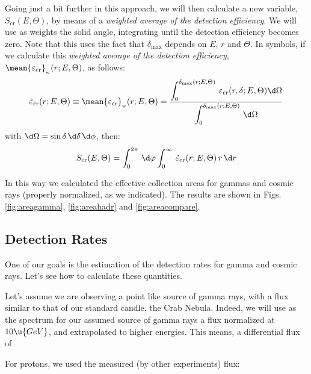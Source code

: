 {Going just a bit further in this approach, we will then calculate a
new variable, $S_{\mathrm{cr}}(E,\Theta)$, by means of a
\emph{weighted average of the detection efficiency}. We will use as
weights the solid angle, integrating until the detection efficiency
becomes zero. Note that this uses the fact that
$\delta_{\mathrm{max}}$ depends on $E$, $r$ and $\Theta$. In symbols,
if we calculate this \emph{weighted average of the detection
  efficiency},
$\mean{\varepsilon_{\mathrm{cr}}}_{\mbox{}_{\mathrm{w}}}(r;E,\Theta)$,
as follows:
%
\begin{equation}
  \label{eq:effw}
  \tilde{\varepsilon}_{\mathrm{cr}}(r;E,\Theta) \equiv 
  \mean{\varepsilon_{\mathrm{cr}}}_{\mbox{}_{\mathrm{w}}}(r;E,\Theta) =
  \frac{\displaystyle\int_0^{\delta_{\mathrm{max}}(r;E,\Theta)}\,
    \varepsilon_{\mathrm{cr}}(r,\delta;E,\Theta)\d\Omega}{
    \displaystyle\int_0^{\delta_{\mathrm{max}}(r;E,\Theta)}\,\d\Omega}
\end{equation}
%
with $\d\Omega = \sin\delta\,\d\delta\,\d\phi$, then:
%
\begin{equation}
  \label{eq:Scrnorm}
  S_{\mathrm{cr}}(E,\Theta) = 
  \int_0^{2\pi}\,\d\varphi 
  \int_0^{\infty}\,\tilde{\varepsilon}_{\mathrm{cr}}(r;E,\Theta)\,r\,\d r 
\end{equation}

In this way we calculated the effective collection areas for gammas
and cosmic rays (properly normalized, as we indicated). The results
are shown in Figs. \ref{fig:areagamma}, \ref{fig:areahadr} and
\ref{fig:areacompare}.

\MORE%

\subsection{Detection Rates}

One of our goals is the estimation of the detection rates for gamma
and cosmic rays. Let's see how to calculate these quantities.

Let's assume we are observing a point like source of gamma rays, with
a flux similar to that of our standard candle, the Crab Nebula.
Indeed, we will use as the spectrum for our assumed source of gamma
rays a flux
%
\gFluxeq
%
normalized at $10\u{GeV}$, and extrapolated to higher energies.
This means, a differential flux of
%
\gdFluxeq

For protons, we used the measured (by other experiments) flux:
%
\crFluxeq

}
